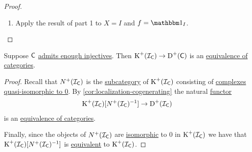 \documentclass[../../main]{subfiles}
\begin{document}
\begin{proof}
\begin{enumerate}
          Since \(X\) is \hyperref[def:exact-complex]{exact}, the sequence \(0 \to \quot{X}{\operatorname{Im} \d_{X}^{k-1}} \to X^{k+1}\) is \hyperref[def:exact-sequence]{exact}.
          Therefore by \hyperref[def:injective-projective-object]{definition of injective object} the following diagram may be completed
          \begin{center}
          \end{center}
    \item Apply the result of part 1 to \(X = I\) and \(f = \id_{I}\).
  \end{enumerate}
\end{proof}


\begin{corollary}
  Suppose \(\mathsf{C}\) \hyperref[def:enough-injectives-projectives]{admits enough injectives}.
  Then \(\operatorname{K}^{+}(\mathcal{I}_{\mathsf{C}}) \to \operatorname{D}^{+}(\mathsf{C})\) is an \hyperref[def:equivalent-categories]{equivalence of categories}.
\end{corollary}
\begin{proof}
  Recall that \(N^{+}(\mathcal{I}_{\mathsf{C}})\) is the \hyperref[def:subcategory]{subcategory} of \(\operatorname{K}^{+}(\mathcal{I}_{\mathsf{C}})\) consisting of \hyperref[def:complex]{complexes} \hyperref[def:quasi-isomorphism]{quasi-isomorphic to 0}.
  By \autoref{cor:localization-cogenerating} the natural \hyperref[def:functor]{functor}
  \begin{equation*}
    \operatorname{K}^{+}(\mathcal{I}_{\mathsf{C}})[N^{+}(\mathcal{I}_{\mathsf{C}})^{-1}] \to \operatorname{D}^{+}(\mathcal{I}_{\mathsf{C}})
  \end{equation*}
  is an \hyperref[def:equivalent-categories]{equivalence of categories}.

  Finally, since the objects of \(N^{+}(\mathcal{I}_{\mathsf{C}})\) are \hyperref[def:categorical-isomorphism]{isomorphic} to \(0\) in \(\operatorname{K}^{+}(\mathcal{I}_{\mathsf{C}})\) we have that \(\operatorname{K}^{+}(\mathcal{I}_{\mathsf{C}})[N^{+}(\mathcal{I}_{\mathsf{C}})^{-1}]\) is \hyperref[def:equivalent-categories]{equivalent} to \(\operatorname{K}^{+}(\mathcal{I}_{\mathsf{C}})\).
\end{proof}
\end{document}
